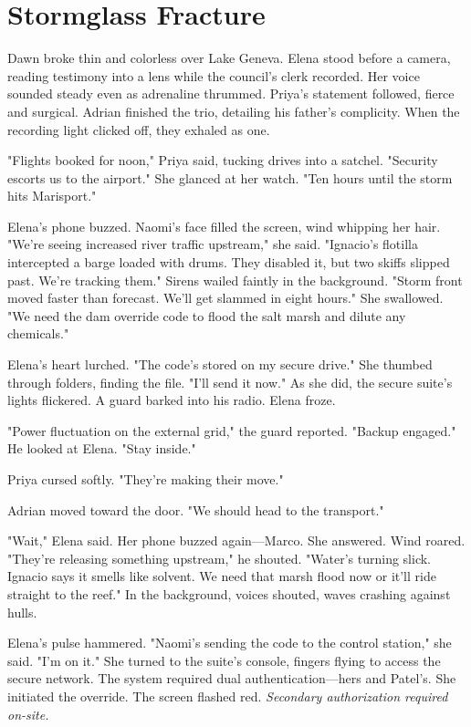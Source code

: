 \chapter{Stormglass Fracture}

Dawn broke thin and colorless over Lake Geneva. Elena stood before a camera, reading testimony into a lens while the council's clerk recorded. Her voice sounded steady even as adrenaline thrummed. Priya's statement followed, fierce and surgical. Adrian finished the trio, detailing his father's complicity. When the recording light clicked off, they exhaled as one.

"Flights booked for noon," Priya said, tucking drives into a satchel. "Security escorts us to the airport." She glanced at her watch. "Ten hours until the storm hits Marisport."

Elena's phone buzzed. Naomi's face filled the screen, wind whipping her hair. "We're seeing increased river traffic upstream," she said. "Ignacio's flotilla intercepted a barge loaded with drums. They disabled it, but two skiffs slipped past. We're tracking them." Sirens wailed faintly in the background. "Storm front moved faster than forecast. We'll get slammed in eight hours." She swallowed. "We need the dam override code to flood the salt marsh and dilute any chemicals."

Elena's heart lurched. "The code's stored on my secure drive." She thumbed through folders, finding the file. "I'll send it now." As she did, the secure suite's lights flickered. A guard barked into his radio. Elena froze.

"Power fluctuation on the external grid," the guard reported. "Backup engaged." He looked at Elena. "Stay inside."

Priya cursed softly. "They're making their move."

Adrian moved toward the door. "We should head to the transport."

"Wait," Elena said. Her phone buzzed again—Marco. She answered. Wind roared. "They're releasing something upstream," he shouted. "Water's turning slick. Ignacio says it smells like solvent. We need that marsh flood now or it'll ride straight to the reef." In the background, voices shouted, waves crashing against hulls.

Elena's pulse hammered. "Naomi's sending the code to the control station," she said. "I'm on it." She turned to the suite's console, fingers flying to access the secure network. The system required dual authentication—hers and Patel's. She initiated the override. The screen flashed red. \textit{Secondary authorization required on-site.}\n

